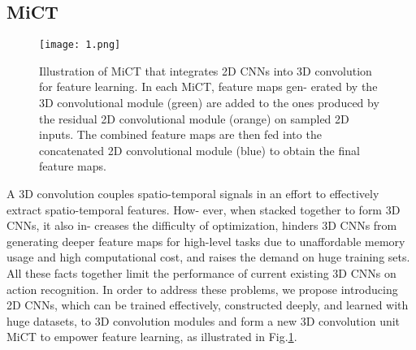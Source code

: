 \documentclass[10pt,twocolumn,letterpaper]{article}
\begin{document}
\subsection{MiCT}
\begin{figure}[ht]
	\centering
	\texttt{[image: 1.png]}
	\caption{Illustration of MiCT that integrates 2D CNNs into 3D
		convolution for feature learning. In each MiCT, feature maps gen-
		erated by the 3D convolutional module (green) are added to the
		ones produced by the residual 2D convolutional module (orange)
		on sampled 2D inputs. The combined feature maps are then fed
		into the concatenated 2D convolutional module (blue) to obtain
		the final feature maps.}
	\label{fig2}
\end{figure}
\par
A 3D convolution couples spatio-temporal signals in an
effort to effectively extract spatio-temporal features. How-
ever, when stacked together to form 3D CNNs, it also in-
creases the difficulty of optimization, hinders 3D CNNs
from generating deeper feature maps for high-level tasks
due to unaffordable memory usage and high computational
cost, and raises the demand on huge training sets. All
these facts together limit the performance of current existing 3D CNNs on action recognition. In order to address these problems, we propose introducing 2D CNNs, which
can be trained effectively, constructed deeply, and learned
with huge datasets, to 3D convolution modules and form a
new 3D convolution unit MiCT to empower feature learning, as illustrated in Fig.\ref{fig2}.


\end{document}
